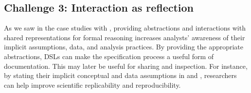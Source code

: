 \begin{comment}
Our experiences designing shared representations in \tea and \tisane highlight
another under-stated benefit of 

Interaction is not just for getting the system to find an answer but a way for
users to be able to not only incrementally express their intents for analysis
but also reflect and refine their understanding of the domain and data. In other
words, finding and using shared representations require designing not only the
programming abstractions but also the interactions with the abstractions. 


\end{comment}

\subsection{Challenge 3: Interaction as reflection}
As we saw in the case studies with \tisane, providing abstractions and
interactions with shared representations for formal reasoning increases
analysts' awareness of their implicit assumptions, data, and analysis practices.
By providing the appropriate abstractions, DSLs can make the specification
process a useful form of documentation. This may later be useful for sharing and
inspection. For instance, by stating their implicit conceptual and data
assumptions in \tea and \tisane, researchers can help improve scientific
replicability and reproducibility. 


